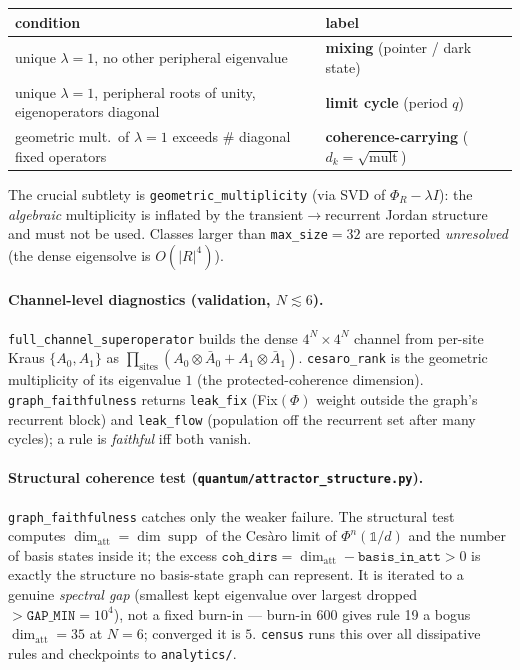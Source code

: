 \documentclass[11pt]{article}
\newcommand{\pf}[1]{\texttt{#1}}          %
\newcommand{\fn}[1]{\texttt{#1}}          %
\begin{document}
\begin{center}\small
\begin{tabular}{@{}ll@{}}
\toprule
condition & label \\
\midrule
unique $\lambda=1$, no other peripheral eigenvalue & \textbf{mixing} (pointer / dark state) \\
unique $\lambda=1$, peripheral roots of unity, eigenoperators diagonal & \textbf{limit cycle} (period $q$) \\
geometric mult.\ of $\lambda=1$ exceeds \# diagonal fixed operators & \textbf{coherence-carrying} ($d_k=\sqrt{\text{mult}}$) \\
\bottomrule
\end{tabular}
\end{center}

The crucial subtlety is \fn{geometric\_multiplicity} (via SVD of
$\Phi_R-\lambda I$): the \emph{algebraic} multiplicity is inflated by the
transient$\to$recurrent Jordan structure and must not be used. Classes larger
than \fn{max\_size}$=32$ are reported \emph{unresolved} (the dense eigensolve is
$O(|R|^4)$).

\paragraph{Channel-level diagnostics (validation, $N\lesssim6$).}
\fn{full\_channel\_superoperator} builds the dense $4^N\times4^N$ channel from
per-site Kraus $\{A_0,A_1\}$ as $\prod_{\text{sites}}(A_0\otimes\bar A_0+A_1\otimes\bar A_1)$.
\fn{cesaro\_rank} is the geometric multiplicity of its eigenvalue $1$ (the
protected-coherence dimension). \fn{graph\_faithfulness} returns \fn{leak\_fix}
(Fix$(\Phi)$ weight outside the graph's recurrent block) and \fn{leak\_flow}
(population off the recurrent set after many cycles); a rule is \emph{faithful}
iff both vanish.

\paragraph{Structural coherence test (\pf{quantum/attractor\_structure.py}).}
\fn{graph\_faithfulness} catches only the weaker failure. The structural test
computes $\dim_{\text{att}}=\dim\operatorname{supp}$ of the Ces\`aro limit of
$\Phi^n(\mathbb 1/d)$ and the number of basis states inside it; the excess
$\fn{coh\_dirs}=\dim_{\text{att}}-\fn{basis\_in\_att}>0$ is exactly the structure
no basis-state graph can represent. It is iterated to a genuine \emph{spectral
gap} (smallest kept eigenvalue over largest dropped $>\fn{GAP\_MIN}=10^4$), not a
fixed burn-in --- burn-in $600$ gives rule 19 a bogus $\dim_{\text{att}}=35$ at
$N=6$; converged it is $5$. \fn{census} runs this over all dissipative rules and
checkpoints to \pf{analytics/}.
\end{document}
